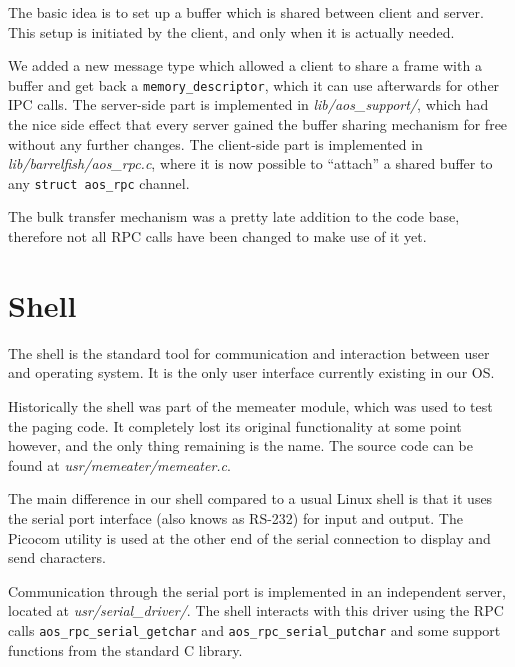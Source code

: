 \documentclass[a4paper,10pt]{article}
\newcommand{\filepath}[1]{\emph{ #1}}
\begin{document}
The basic idea is to set up a buffer which is shared between client and server.
This setup is initiated by the client, and only when it is actually needed.

We added a new message type which allowed a client to share a frame with a buffer and get back a \lstinline!memory_descriptor!, which it can use afterwards for other IPC calls.
The server-side part is implemented in \filepath{lib/aos\_support/}, which had the nice side effect that every server gained the buffer sharing mechanism for free without any further changes.
The client-side part is implemented in \filepath{lib/barrelfish/aos\_rpc.c}, where it is now possible to ``attach'' a shared buffer to any \lstinline!struct aos_rpc! channel.

The bulk transfer mechanism was a pretty late addition to the code base, therefore not all RPC calls have been changed to make use of it yet.

\section{Shell}
The shell is the standard tool for communication and interaction between user and operating system.
It is the only user interface currently existing in our OS.
  
Historically the shell was part of the memeater module, which was used to test the paging code.
It completely lost its original functionality at some point however, and the only thing remaining is the name.
The source code can be found at \filepath{usr/memeater/memeater.c}.

The main difference in our shell compared to a usual Linux shell is that it uses the serial port interface (also knows as RS-232) for input and output.
The Picocom \cite{web:picocom}
 utility is used at the other end of the serial connection to display and send characters.

Communication through the serial port is implemented in an independent server, located at \filepath{usr/serial\_driver/}.
The shell interacts with this driver using the RPC calls \lstinline!aos_rpc_serial_getchar! and \lstinline!aos_rpc_serial_putchar! and some support functions from the standard C library.
\end{document}
